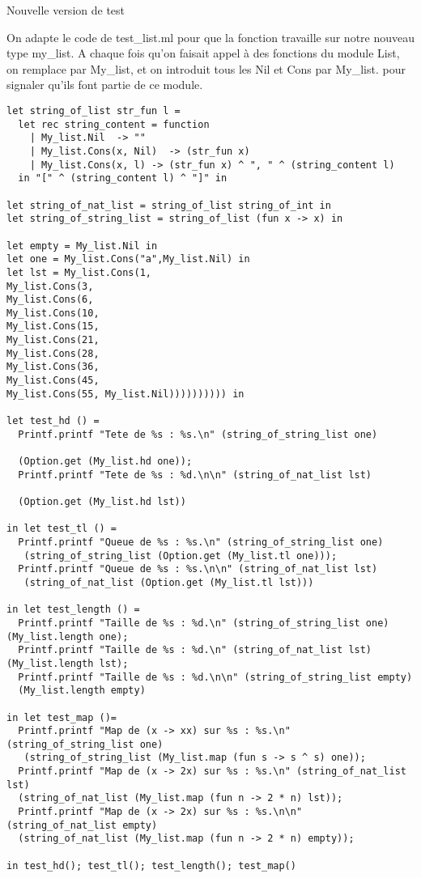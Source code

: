 \documentclass{article}
\theoremstyle{definition}
\begin{document}
\begin{section}{Nouvelle version de test}

On adapte le code de test\_list.ml pour que la fonction travaille sur notre nouveau type my\_list. A chaque fois qu'on faisait appel à des fonctions du module List, on remplace par My\_list, et on introduit tous les Nil et Cons par My\_list. pour signaler qu'ils font partie de ce module.


\begin{lstlisting}[language=caml]
let string_of_list str_fun l = 
  let rec string_content = function
    | My_list.Nil  -> ""
    | My_list.Cons(x, Nil)  -> (str_fun x)
    | My_list.Cons(x, l) -> (str_fun x) ^ ", " ^ (string_content l) 
  in "[" ^ (string_content l) ^ "]" in

let string_of_nat_list = string_of_list string_of_int in
let string_of_string_list = string_of_list (fun x -> x) in

let empty = My_list.Nil in
let one = My_list.Cons("a",My_list.Nil) in 
let lst = My_list.Cons(1, 
My_list.Cons(3,
My_list.Cons(6,
My_list.Cons(10, 
My_list.Cons(15, 
My_list.Cons(21, 
My_list.Cons(28, 
My_list.Cons(36, 
My_list.Cons(45, 
My_list.Cons(55, My_list.Nil)))))))))) in

let test_hd () = 
  Printf.printf "Tete de %s : %s.\n" (string_of_string_list one)
   
  (Option.get (My_list.hd one));
  Printf.printf "Tete de %s : %d.\n\n" (string_of_nat_list lst)
   
  (Option.get (My_list.hd lst))

in let test_tl () = 
  Printf.printf "Queue de %s : %s.\n" (string_of_string_list one)
   (string_of_string_list (Option.get (My_list.tl one)));
  Printf.printf "Queue de %s : %s.\n\n" (string_of_nat_list lst)
   (string_of_nat_list (Option.get (My_list.tl lst)))

in let test_length () = 
  Printf.printf "Taille de %s : %d.\n" (string_of_string_list one) (My_list.length one);
  Printf.printf "Taille de %s : %d.\n" (string_of_nat_list lst) (My_list.length lst);
  Printf.printf "Taille de %s : %d.\n\n" (string_of_string_list empty) 
  (My_list.length empty)

in let test_map ()= 
  Printf.printf "Map de (x -> xx) sur %s : %s.\n" (string_of_string_list one)
   (string_of_string_list (My_list.map (fun s -> s ^ s) one));
  Printf.printf "Map de (x -> 2x) sur %s : %s.\n" (string_of_nat_list lst) 
  (string_of_nat_list (My_list.map (fun n -> 2 * n) lst));
  Printf.printf "Map de (x -> 2x) sur %s : %s.\n\n" (string_of_nat_list empty) 
  (string_of_nat_list (My_list.map (fun n -> 2 * n) empty));

in test_hd(); test_tl(); test_length(); test_map()
\end{lstlisting}

\end{section}
\end{document}
